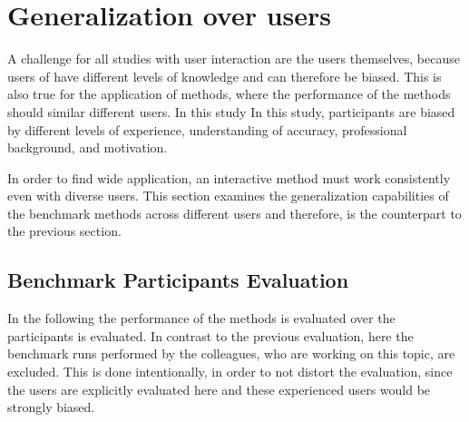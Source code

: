 
\section{Generalization over users}\label{ord:ch5:sec_3_generalization_user}

A challenge for all studies with user interaction are the users themselves, because users of have different levels of knowledge and can therefore be biased.
This is also true for the application of methods, where the performance of the methods should similar different users.
In this study 
In this study, participants are biased by different levels of experience, understanding of accuracy, professional background, and motivation.

In order to find wide application, an interactive method must work consistently even with diverse users.
This section examines the generalization capabilities of the benchmark methods across different users and therefore, is the counterpart to the previous section.


\subsection{Benchmark Participants Evaluation}\label{ord:ch5:sec3:subsec1}

In the following the performance of the methods is evaluated over the \getNumberBenchmarkParticipants \space participants is evaluated.
In contrast to the previous evaluation, here the benchmark runs performed by the colleagues, who are working on this topic, are excluded.
This is done intentionally, in order to not distort the evaluation, since the users are explicitly evaluated here and these experienced users would be strongly biased.

